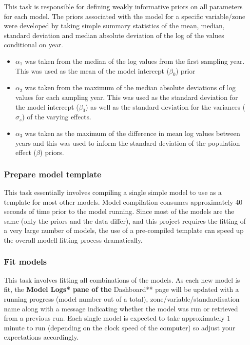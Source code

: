 \documentclass[
  8pt,
  a4paper]{article}
\providecommand{\tightlist}{%
  \setlength{\itemsep}{0pt}\setlength{\parskip}{0pt}}\usepackage{longtable,booktabs,array}
\begin{document}
This task is responsible for defining weakly informative priors on all
parameters for each model. The priors associated with the model for a
specific variable/zone were developed by taking simple summary
statistics of the mean, median, standard deviation and median absolute
deviation of the log of the values conditional on year.

\begin{itemize}
\tightlist
\item
  \(\alpha_1\) was taken from the median of the log values from the
  first sampling year. This was used as the mean of the model intercept
  (\(\beta_0\)) prior
\item
  \(\alpha_2\) was taken from the maximum of the median absolute
  deviations of log values for each sampling year. This was used as the
  standard deviation for the model intercept (\(\beta_0\)) as well as
  the standard deviation for the variances (\(\sigma_s\)) of the varying
  effects.
\item
  \(\alpha_3\) was taken as the maximum of the difference in mean log
  values between years and this was used to inform the standard
  deviation of the population effect (\(\beta\)) priors.
\end{itemize}

\subsubsection{Prepare model template}\label{prepare-model-template}

This task essentially involves compiling a single simple model to use as
a template for most other models. Model compilation consumes
approximately 40 seconds of time prior to the model running. Since most
of the models are the same (only the priors and the data differ), and
this project requires the fitting of a very large number of models, the
use of a pre-compiled template can speed up the overall modell fitting
process dramatically.

\subsubsection{Fit models}\label{fit-models}

This task involves fitting all combinations of the models. As each new
model is fit, the \textbf{Model Logs* pane of the }Dashboard** page will
be updated with a running progress (model number out of a total),
zone/variable/standardisation name along with a message indicating
whether the model was run or retrieved from a previous run. Each single
model is expected to take approximately 1 minute to run (depending on
the clock speed of the computer) so adjust your expectations
accordingly.
\end{document}
